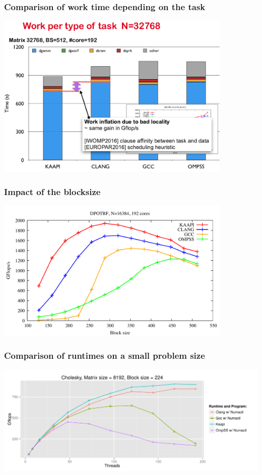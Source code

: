 \documentclass[xcolor={usenames,dvipsnames,svgnames,table}, aspectratio=43]{beamer}
\begin{document}
\begin{frame}
  \frametitle{Comparison of work time depending on the task}
  \begin{center}
    \includegraphics[width=0.85\textwidth]{graph/work_per_task.pdf}
  \end{center}
\end{frame}

\begin{frame}
  \frametitle{Impact of the blocksize}
  \begin{center}
    \includegraphics[width=0.85\textwidth]{graph/graph_bs.pdf}
  \end{center}
\end{frame}

\begin{frame}
  \frametitle{Comparison of runtimes on a small problem size}
  \begin{center}
    \includegraphics[width=\textwidth]{graph/dpotrf_scale_8k.pdf}
  \end{center}
\end{frame}
\end{document}

